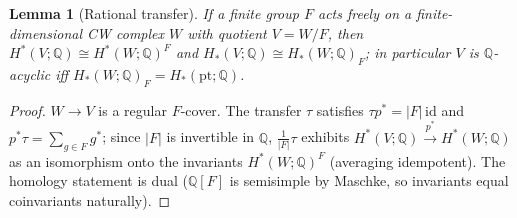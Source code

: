 \documentclass[12pt]{article}
\newtheorem{lemma}[theorem]{Lemma}
\theoremstyle{definition}
\begin{document}
\begin{lemma}[Rational transfer]\label{lem:transfer}
If a finite group $F$ acts freely on a finite-dimensional CW complex $W$ with
quotient $V=W/F$, then
$H^*(V;\mathbb{Q})\cong H^*(W;\mathbb{Q})^F$ and
$H_*(V;\mathbb{Q})\cong H_*(W;\mathbb{Q})_F$; in particular $V$ is
$\mathbb{Q}$-acyclic iff $H_*(W;\mathbb{Q})_F=H_*(\mathrm{pt};\mathbb{Q})$.
\end{lemma}
\begin{proof}
$W\to V$ is a regular $F$-cover. The transfer $\tau$ satisfies
$\tau p^*=|F|\,\mathrm{id}$ and $p^*\tau=\sum_{g\in F}g^*$; since $|F|$ is
invertible in $\mathbb{Q}$, $\tfrac1{|F|}\tau$ exhibits
$H^*(V;\mathbb{Q})\xrightarrow{p^*}H^*(W;\mathbb{Q})$ as an isomorphism onto the
invariants $H^*(W;\mathbb{Q})^F$ (averaging idempotent). The homology
statement is dual ($\mathbb{Q}[F]$ is semisimple by Maschke, so invariants
equal coinvariants naturally).
\end{proof}
\end{document}
